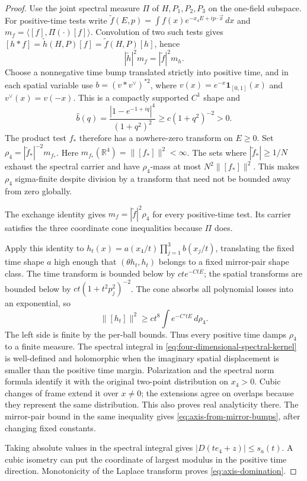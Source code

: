 \documentclass[11pt,letterpaper,reqno]{amsart}
\theoremstyle{definition}
\theoremstyle{remark}
\begin{document}
\begin{proof}
Use the joint spectral measure $\Pi$ of $H,P_1,P_2,P_3$ on the
one-field subspace. For positive-time tests write
$\widetilde f(E,p)=\int f(x)e^{-x_4E+ip\cdot\vec x}\,dx$ and
$m_f=\langle[f],\Pi(\cdot)[f]\rangle$. Convolution of two such
tests gives
$[h*f]=\widetilde h(H,P)[f]=\widetilde f(H,P)[h]$, hence
\[
 |\widetilde h|^2m_f=|\widetilde f|^2m_h.
\]
Choose a nonnegative time bump translated strictly into positive
time, and in each spatial variable use
$b=(v*v^\vee)^{*2}$, where $v(x)= e^{-x}\mathbf1_{[0,1]}(x)$
and $v^\vee(x)=v(-x)$.
This is a compactly supported $C^1$ shape and
\[
 \widehat b(q)=\frac{|1-e^{-1+iq}|^4}{(1+q^2)^2}
                     \ge c(1+q^2)^{-2}>0.
\]
The product test $f_*$ therefore has a nowhere-zero transform on
$E\ge0$. Set $\rho_4=|\widetilde f_*|^{-2}m_{f_*}$.
Here \(m_{f_*}(\mathbb R^4)=\|[f_*]\|^2<\infty\).
The sets where \(|\widetilde f_*|\ge1/N\)
exhaust the spectral carrier and have
\(\rho_4\)-mass at most \(N^2\|[f_*]\|^2\).
This makes \(\rho_4\) sigma-finite despite
division by a transform that need not be
bounded away from zero globally.

The exchange identity gives $m_f=|\widetilde f|^2\rho_4$ for
every positive-time test. Its carrier satisfies the three coordinate
cone inequalities because $\Pi$ does.

Apply this identity to
$h_t(x)=a(x_4/t)\prod_{j=1}^3b(x_j/t)$, translating the fixed
time shape $a$ high enough that $(\theta h_t,h_t)$ belongs to a
fixed mirror-pair shape class. The time transform is bounded below
by $ct e^{-CtE}$; the spatial transforms are bounded below by
$ct(1+t^2p_j^2)^{-2}$. The cone absorbs all polynomial losses into
an exponential, so
\[
 \|[h_t]\|^2\ge ct^8\int e^{-C'tE}\,d\rho_4.
\]
The left side is finite by the per-ball bounds. Thus every positive
time damps $\rho_4$ to a finite measure. The spectral integral in
\eqref{eq:four-dimensional-spectral-kernel} is well-defined and
holomorphic when the imaginary spatial displacement is smaller than
the positive time margin. Polarization and the spectral norm formula
identify it with the original two-point distribution on $x_4>0$.
Cubic changes of frame extend it over $x\ne0$; the extensions agree
on overlaps because they represent the same distribution. This also
proves real analyticity there. The mirror-pair bound in the same
inequality gives \eqref{eq:axis-from-mirror-bumps}, after changing
fixed constants.

Taking absolute values in the spectral integral gives
$|D(te_4+z)|\le s_a(t)$. A cubic isometry can put the coordinate
of largest modulus in the positive time direction. Monotonicity of
the Laplace transform proves \eqref{eq:axis-domination}.
\end{proof}
\end{document}

